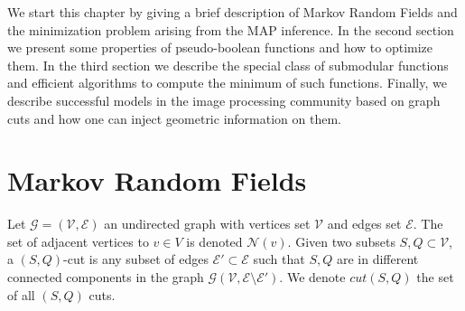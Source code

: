 We start this chapter by giving a brief description of Markov Random Fields and the minimization problem arising from the MAP inference. In the second section we present some properties of pseudo-boolean functions and how to optimize them. In the third section we describe the special class of submodular functions and efficient algorithms to compute the minimum of such functions. Finally, we describe successful models in the image processing community based on graph cuts and how one can inject geometric information on them.


\section{Markov Random Fields}
\label{ch2:sec:markov-random-fields}

Let $\mathcal{G}=(\mathcal{V},\mathcal{E})$ an undirected graph with vertices set $\mathcal{V}$ and edges set $\mathcal{E}$. The set of adjacent vertices to $v \in V$ is denoted $\mathcal{N}(v)$. Given two subsets $S,Q \subset \mathcal{V}$, a $(S,Q)$-cut is any subset of edges $\mathcal{E}' \subset \mathcal{E}$ such that $S,Q$ are in different connected components in the graph $\mathcal{G}(\mathcal{V},\mathcal{E} \setminus \mathcal{E}')$. We denote $cut(S,Q)$ the set of all $(S,Q)$ cuts.

